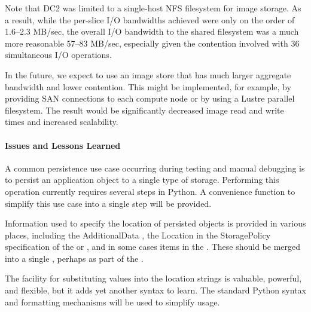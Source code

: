 Note that DC2 was limited to a single-host NFS filesystem for image
storage.  As a result, while the per-slice I/O bandwidths achieved were
only on the order of 1.6--2.3 MB/sec, the overall I/O bandwidth to the
shared filesystem was a much more reasonable 57--83 MB/sec, especially
given the contention involved with 36 simultaneous I/O operations.

In the future, we expect to use an image store that has much larger
aggregate bandwidth and lower contention.  This might be implemented,
for example, by providing SAN connections to each compute node or by
using a Lustre parallel filesystem.  The result would be significantly
decreased image read and write times and increased scalability.

\paragraph{Issues and Lessons Learned}

A common persistence use case occurring during testing and manual
debugging is to persist an application object to a single type of
storage.  Performing this operation currently requires several steps in
Python.  A convenience function to simplify this use case into a single
step will be provided.

Information used to specify the location of persisted objects is
provided in various places, including the AdditionalData
, the Location in the StoragePolicy specification of
the  or , and in some cases items in
the  .  These should be merged
into a single , perhaps as part of the
.

The facility for substituting values into the location strings is
valuable, powerful, and flexible, but it adds yet another syntax to
learn.  The standard Python syntax and formatting mechanisms will be
used to simplify usage.
